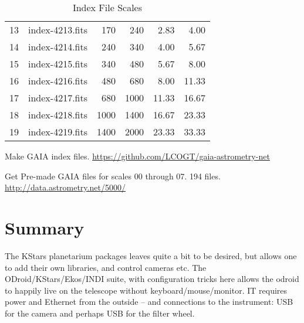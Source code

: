 \documentclass[letter,11pt,oneside]{article}
\begin{document}
\begin{table}[h!]
\begin{tabular}{| l | l | r  r | r  r |}
13    &  index-4213.fits      &     170  &   240  &      2.83 &   4.00    \\ 
14    &  index-4214.fits      &     240  &   340  &      4.00 &   5.67    \\ 
15    &  index-4215.fits      &     340  &   480  &      5.67 &   8.00    \\ 
16    &  index-4216.fits      &     480  &   680  &      8.00 &  11.33    \\ 
17    &  index-4217.fits      &     680  &  1000  &     11.33 &  16.67    \\ 
\hline
18    &  index-4218.fits      &     1000 &  1400  &     16.67 &  23.33    \\ 
19    &  index-4219.fits      &     1400 &  2000  &     23.33 &  33.33    \\ 
\hline
\end{tabular}
\caption[TOC]{Index File Scales}
\label{table:IndexFileScales}
\end{table}


Make GAIA index files.
\url{https://github.com/LCOGT/gaia-astrometry-net}

Get Pre-made GAIA files for scales 00 through 07. 194 files.
\url{http://data.astrometry.net/5000/}



\section{Summary} \label{sec:summary}

The KStars planetarium packages leaves quite a bit to be desired,
but allows one to add their own libraries, and control cameras etc.
The ODroid/KStars/Ekos/INDI suite, with configuration tricks here
allows the odroid to happily live on the telescope without
keyboard/mouse/monitor. IT requires power and Ethernet from the
outside -- and connections to the instrument: USB for the camera
and perhaps USB for the filter wheel.











\end{document}
